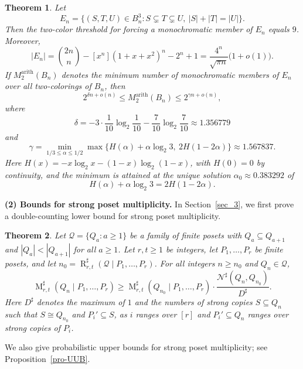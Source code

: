 \documentclass[twoside,12pt]{article}
\newtheorem{theorem}{Theorem}[section]
\begin{document}
\begin{theorem}\label{thm:main}
Let
\[
 E_n=\{(S,T,U)\in B_n^3:S\subsetneq T\subsetneq U,\ |S|+|T|=|U|\}.
\]
Then the two-color threshold for forcing a monochromatic member of $E_n$ equals $9$. Moreover,
\[
|E_n|
=\binom{2n}{n}-[x^n](1+x+x^2)^n-2^n+1
=\frac{4^n}{\sqrt{\pi n}}\bigl(1+o(1)\bigr).
\]
If $M^{\mathrm{arith}}_2(B_n)$ denotes the minimum number of monochromatic members of $E_n$ over all two-colorings of $B_n$, then
\[
2^{\delta n+o(n)}
\leq M^{\mathrm{arith}}_2(B_n)
\leq 2^{\gamma n+o(n)},
\]
where
\[
\delta=-3\cdot\frac1{10}\log_2\frac1{10}-\frac7{10}\log_2\frac7{10}
      \approx 1.356779
\]
and
\[
\gamma=\min_{1/3\leq\alpha\leq1/2}
\max\{H(\alpha)+\alpha\log_2 3,\ 2H(1-2\alpha)\}
      \approx 1.567837.
\]
Here $H(x)=-x\log_2 x-(1-x)\log_2(1-x)$, with $H(0)=0$ by continuity, and the minimum is attained at the unique solution $\alpha_0\approx0.383292$ of
\[
H(\alpha)+\alpha\log_2 3=2H(1-2\alpha).
\]
\end{theorem}

\medskip\noindent\textbf{(2) Bounds for strong poset multiplicity.}
In Section~\ref{sec_3}, we first prove a double-counting lower bound for strong poset multiplicity.

\begin{theorem}\label{th-double-counting}
Let $\mathcal Q=\{Q_a:a\geq1\}$ be a family of finite posets with $Q_a\subseteq Q_{a+1}$ and $|Q_a|<|Q_{a+1}|$ for all $a\geq1$. Let $r,t\geq1$ be integers, let $P_1,\dots,P_r$ be finite posets, and let $n_0=\operatorname R^{\sharp}_{r,t}(\mathcal Q\mid P_1,\dots,P_r)$. For all integers $n\geq n_0$ and $Q_n\in\mathcal Q$,
\begin{equation}\label{eq:main_strong_bound}
\operatorname M^{\sharp}_{r,t}(Q_n\mid P_1,\dots,P_r)
\geq
\operatorname M^{\sharp}_{r,t}(Q_{n_0}\mid P_1,\dots,P_r)
\cdot \frac{\mathcal N^{\sharp}(Q_n,Q_{n_0})}{D^{\sharp}}.
\end{equation}
Here $D^{\sharp}$ denotes the maximum of $1$ and the numbers of strong copies $S\subseteq Q_n$ such that $S\cong Q_{n_0}$ and $P_i'\subseteq S$, as $i$ ranges over $[r]$ and $P_i'\subseteq Q_n$ ranges over strong copies of $P_i$.
\end{theorem}
We also give probabilistic upper bounds for strong poset multiplicity; see Proposition~\ref{pro-UUB}.
\end{document}
